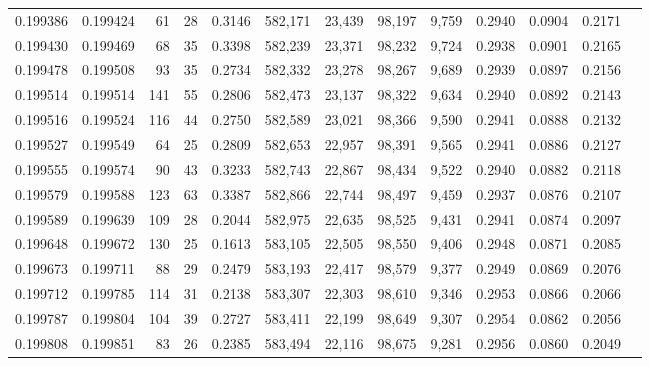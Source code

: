 \begin{tabular}{rrrrrrrrrrrrr}
0.199386 & 0.199424 &    61 &  28 &                                     0.3146 & 582,171 &  23,439 &  98,197 &   9,759 & 0.2940 & 0.0904 & 0.2171 \\
0.199430 & 0.199469 &    68 &  35 &                                     0.3398 & 582,239 &  23,371 &  98,232 &   9,724 & 0.2938 & 0.0901 & 0.2165 \\
0.199478 & 0.199508 &    93 &  35 &                                     0.2734 & 582,332 &  23,278 &  98,267 &   9,689 & 0.2939 & 0.0897 & 0.2156 \\
0.199514 & 0.199514 &   141 &  55 &                                     0.2806 & 582,473 &  23,137 &  98,322 &   9,634 & 0.2940 & 0.0892 & 0.2143 \\
0.199516 & 0.199524 &   116 &  44 &                                     0.2750 & 582,589 &  23,021 &  98,366 &   9,590 & 0.2941 & 0.0888 & 0.2132 \\
0.199527 & 0.199549 &    64 &  25 &                                     0.2809 & 582,653 &  22,957 &  98,391 &   9,565 & 0.2941 & 0.0886 & 0.2127 \\
0.199555 & 0.199574 &    90 &  43 &                                     0.3233 & 582,743 &  22,867 &  98,434 &   9,522 & 0.2940 & 0.0882 & 0.2118 \\
0.199579 & 0.199588 &   123 &  63 &                                     0.3387 & 582,866 &  22,744 &  98,497 &   9,459 & 0.2937 & 0.0876 & 0.2107 \\
0.199589 & 0.199639 &   109 &  28 &                                     0.2044 & 582,975 &  22,635 &  98,525 &   9,431 & 0.2941 & 0.0874 & 0.2097 \\
0.199648 & 0.199672 &   130 &  25 &                                     0.1613 & 583,105 &  22,505 &  98,550 &   9,406 & 0.2948 & 0.0871 & 0.2085 \\
0.199673 & 0.199711 &    88 &  29 &                                     0.2479 & 583,193 &  22,417 &  98,579 &   9,377 & 0.2949 & 0.0869 & 0.2076 \\
0.199712 & 0.199785 &   114 &  31 &                                     0.2138 & 583,307 &  22,303 &  98,610 &   9,346 & 0.2953 & 0.0866 & 0.2066 \\
0.199787 & 0.199804 &   104 &  39 &                                     0.2727 & 583,411 &  22,199 &  98,649 &   9,307 & 0.2954 & 0.0862 & 0.2056 \\
0.199808 & 0.199851 &    83 &  26 &                                     0.2385 & 583,494 &  22,116 &  98,675 &   9,281 & 0.2956 & 0.0860 & 0.2049 \\

\end{tabular}
